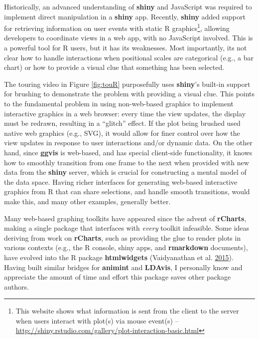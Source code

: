 \documentclass[12pt,]{isuthesis}
\let\rmarkdownfootnote\footnote%
\def\footnote{\protect\rmarkdownfootnote}
\begin{document}
Historically, an advanced understanding of \textbf{shiny} and JavaScript
was required to implement direct manipulation in a \textbf{shiny} app.
Recently, \textbf{shiny} added support for retrieving information on
user events with static R graphics\footnote{This website shows what
  information is sent from the client to the server when users interact
  with plot(s) via mouse event(s) --
  \url{http://shiny.rstudio.com/gallery/plot-interaction-basic.html}},
allowing developers to coordinate views in a web app, with no JavaScript
involved. This is a powerful tool for R users, but it has its
weaknesses. Most importantly, its not clear how to handle interactions
when positional scales are categorical (e.g., a bar chart) or how to
provide a visual clue that something has been selected.

The touring video in Figure \ref{fig:touR} purposefully uses
\textbf{shiny}'s built-in support for brushing to demonstrate the
problem with providing a visual clue. This points to the fundamental
problem in using non-web-based graphics to implement interactive
graphics in a web browser: every time the view updates, the display must
be redrawn, resulting in a ``glitch'' effect. If the plot being brushed
used native web graphics (e.g., SVG), it would allow for finer control
over how the view updates in response to user interactions and/or
dynamic data. On the other hand, since \textbf{ggvis} is web-based, and
has special client-side functionality, it knows how to smoothly
transition from one frame to the next when provided with new data from
the \textbf{shiny} server, which is crucial for constructing a mental
model of the data space. Having richer interfaces for generating
web-based interactive graphics from R that can share selections, and
handle smooth transitions, would make this, and many other examples,
generally better.

Many web-based graphing toolkits have appeared since the advent of
\textbf{rCharts}, making a single package that interfaces with
\emph{every} toolkit infeasible. Some ideas deriving from work on
\textbf{rCharts}, such as providing the glue to render plots in various
contexts (e.g., the R console, shiny apps, and \textbf{rmarkdown}
documents), have evolved into the R package \textbf{htmlwidgets}
(Vaidyanathan et al. \protect\hyperlink{ref-htmlwidgets}{2015}). Having
built similar bridges for \textbf{animint} and \textbf{LDAvis}, I
personally know and appreciate the amount of time and effort this
package saves other package authors.
\end{document}
